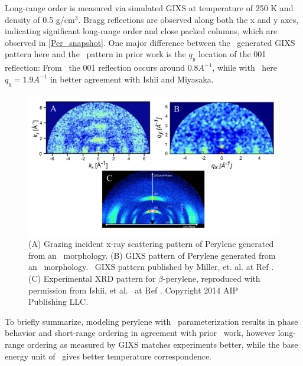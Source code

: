 Long-range order is measured via simulated GIXS at temperature of 250 K and density of 0.5 g/cm$^3$. 
Bragg reflections are observed along both the x and y axes, indicating significant long-range order and close packed columns, which are observed in \autoref{Per_snapshot}. 
One major difference between the \espff~generated GIXS pattern here and the \oplsff~pattern in prior work is the $q_y$ location of the 001 reflection: From \oplsff~the 001 reflection occurs around $0.8 A^{-1}$, while with \espff~here $q_y=1.9 A^{-1}$ in better agreement with Ishii and Miyasaka\citep{Ishii}.
\begin{figure}[h!]
    \centering
    \includegraphics[width=1\textwidth]{src/figures/FF_figs/per_gixs.png} 
    \caption{(A) Grazing incident x-ray scattering pattern of Perylene generated from an \espff~morphology. (B) GIXS pattern of Perylene generated from an \oplsff~morphology. \oplsff~GIXS pattern published by Miller, et. al. at Ref \citep{miller_enhanced_2017}. (C) Experimental XRD pattern for $\beta$-perylene, reproduced with permission from Ishii, et al.~ at Ref \citep{ishii_fully_2014}. Copyright 2014 AIP Publishing LLC.}
    \label{Per_GIXS}
\end{figure}
To briefly summarize, modeling perylene with \espff~parameterization results in phase behavior and short-range ordering in agreement with prior \oplsff~work, however long-range ordering as measured by GIXS matches experiments better, while the base energy unit of \oplsff~gives better temperature correspondence.

